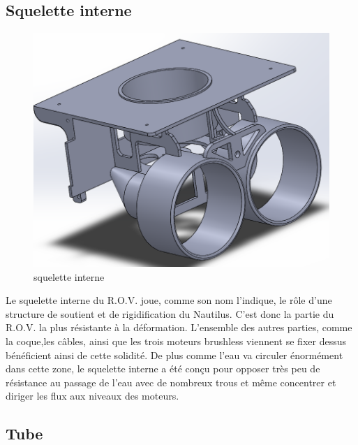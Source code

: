 \documentclass[a4paper,11pt]{report}
\begin{document}
				\subsection{Squelette interne}
				
				\begin{figure}[!h]
					\begin{center}
						\includegraphics[scale=0.3]{Photos/Capture5.png}
						\caption{squelette interne}
					\end{center}
				\end{figure}
				
				Le squelette interne du R.O.V. joue, comme son nom l'indique, le rôle d'une structure de soutient et de rigidification du Nautilus. C'est donc la partie du R.O.V. la plus résistante à la déformation. L'ensemble des autres parties, comme la coque,les câbles, ainsi que les trois moteurs brushless viennent se fixer dessus bénéficient ainsi de cette solidité. De plus comme l'eau va circuler énormément dans cette zone, le squelette interne a été conçu pour opposer très peu de résistance au passage de l'eau avec de nombreux trous et même concentrer et diriger les flux aux niveaux des moteurs. \newpage
					
					
				\subsection{Tube}	
				
\end{document}
